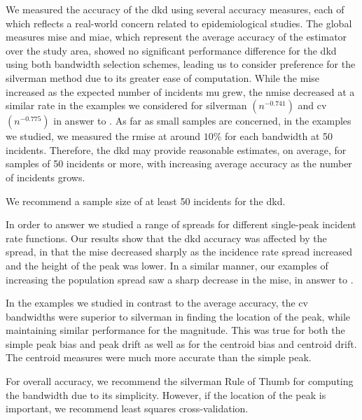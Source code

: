 We measured the accuracy of the \gls{dkd} using several accuracy measures,
each of which reflects a real-world concern related to epidemiological studies.
The global measures \gls{mise} and \gls{miae},
which represent the average accuracy of the estimator over the study area,
showed no significant performance difference
for the \gls{dkd} using both bandwidth selection schemes,
leading us to consider preference for the \gls{silverman} method due to its greater ease of computation.
While the \gls{mise} increased as the expected number of incidents \gls{mu} grew,
the \acrfull{nmise} decreased at a similar rate
in the examples we considered
for \gls{silverman} $(n^{-0.741})$ and \gls{cv} $(n^{-0.775})$ in answer to .
As far as small samples are concerned,
in the examples we studied,
we measured the \acrfull{rmise} at around $10\%$ for each bandwidth at 50 incidents.
Therefore,
the \gls{dkd} may provide reasonable estimates,
on average,
for samples of 50 incidents or more,
with increasing average accuracy as the number of incidents grows.
\begin{rec}
    \label{rec:small-sample}
    We recommend a sample size of at least 50 incidents for the \gls{dkd}.
\end{rec}

In order to answer  we studied a range of spreads for different single-peak incident rate functions.
Our results show that the \gls{dkd} accuracy was affected by the spread,
in that the \gls{mise} decreased sharply as the incidence rate spread increased and the height of the peak was lower.
In a similar manner,
our examples of increasing the population spread saw a sharp decrease in the \gls{mise},
in answer to .

In the examples we studied
in contrast to the average accuracy,
the \gls{cv} bandwidths were superior to \gls{silverman}
in finding the location of the peak,
while maintaining similar performance for the magnitude.
This was true for both the simple \gls{peak bias} and \gls{peak drift} as well as for the
\gls{centroid bias} and \gls{centroid drift}.
The centroid measures were much more accurate than the simple peak.
\begin{rec}
    \label{rec:bandwidth-scheme}
    For overall accuracy, we recommend the \gls{silverman} Rule of Thumb for computing the bandwidth due to its simplicity.
    However, if the location of the peak is important, we recommend least squares cross-validation.
\end{rec}

